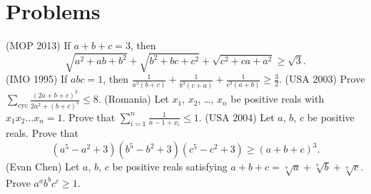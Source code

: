 \documentclass[11pt]{scrartcl}
\begin{document}
\section{Problems}
\begin{enumerate}
	\ii (MOP 2013) If $a+b+c=3$, then \[ \sqrt{a^2+ab+b^2}+\sqrt{b^2+bc+c^2}+\sqrt{c^2+ca+a^2} \ge \sqrt 3. \]
	\ii (IMO 1995) If $abc=1$, then $\frac{1}{a^3(b+c)}+\frac{1}{b^3(c+a)}+\frac{1}{c^3(a+b)}\ge\frac{3}{2}$.
	\ii (USA 2003) Prove $\sum_{\text{cyc}} \frac{(2a+b+c)^2}{2a^2+(b+c)^2} \le 8$.
	\ii (Romania) Let $x_1$, $x_2$, \dots, $x_n$ be positive reals with $x_1x_2 \dots x_n=1$. Prove that $\sum_{i=1}^n \frac{1}{n-1+x_i} \le 1$.
	\ii (USA 2004) Let $a$, $b$, $c$ be positive reals. Prove that
	\[ \left( a^5-a^2+3 \right)\left( b^5-b^2+3 \right)\left( c^5-c^2+3 \right) \ge \left( a+b+c \right)^3. \]
	\ii (Evan Chen) Let $a$, $b$, $c$ be positive reals satisfying $a+b+c = \sqrt[7]{a} + \sqrt[7]{b} + \sqrt[7]{c}$. Prove $a^a b^b c^c \ge 1$.
\end{enumerate}
\end{document}
